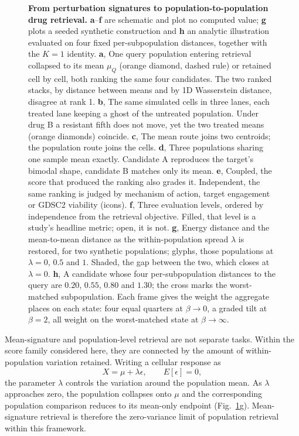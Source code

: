 \documentclass[11pt,letterpaper]{article}
\begin{document}
\begin{figure}[p]
\caption{\textbf{From perturbation signatures to population-to-population drug retrieval.}
\textbf{a}--\textbf{f} are schematic and plot no computed value; \textbf{g} plots a seeded synthetic construction and \textbf{h} an analytic illustration evaluated on four fixed per-subpopulation distances, together with the $K=1$ identity.
\textbf{a}, One query population entering retrieval collapsed to its mean $\mu_Q$ (orange diamond, dashed rule) or retained cell by cell, both ranking the same four candidates. The two ranked stacks, by distance between means and by 1D Wasserstein distance, disagree at rank 1.
\textbf{b}, The same simulated cells in three lanes, each treated lane keeping a ghost of the untreated population. Under drug B a resistant fifth does not move, yet the two treated means (orange diamonds) coincide.
\textbf{c}, The mean route joins two centroids; the population route joins the cells.
\textbf{d}, Three populations sharing one sample mean exactly. Candidate A reproduces the target's bimodal shape, candidate B matches only its mean.
\textbf{e}, Coupled, the score that produced the ranking also grades it. Independent, the same ranking is judged by mechanism of action, target engagement or GDSC2 viability (icons).
\textbf{f}, Three evaluation levels, ordered by independence from the retrieval objective. Filled, that level is a study's headline metric; open, it is not.
\textbf{g}, Energy distance and the mean-to-mean distance as the within-population spread $\lambda$ is restored, for two synthetic populations; glyphs, those populations at $\lambda=0$, $0.5$ and $1$. Shaded, the gap between the two, which closes at $\lambda=0$.
\textbf{h}, A candidate whose four per-subpopulation distances to the query are $0.20$, $0.55$, $0.80$ and $1.30$; the cross marks the worst-matched subpopulation. Each frame gives the weight the aggregate places on each state: four equal quarters at $\beta\to0$, a graded tilt at $\beta=2$, all weight on the worst-matched state at $\beta\to\infty$.}
\label{fig:1}
\end{figure}
\FloatBarrier   %

Mean-signature and population-level retrieval are not separate tasks. Within the score family considered here, they are connected by the amount of within-population variation retained. Writing a cellular response as
$$
X=\mu+\lambda\epsilon,
\qquad E[\epsilon]=0,
$$
the parameter $\lambda$ controls the variation around the population mean. As $\lambda$ approaches zero, the population collapses onto $\mu$ and the corresponding population comparison reduces to its mean-only endpoint (Fig.~\ref{fig:1}g). Mean-signature retrieval is therefore the zero-variance limit of population retrieval within this framework.
\end{document}
